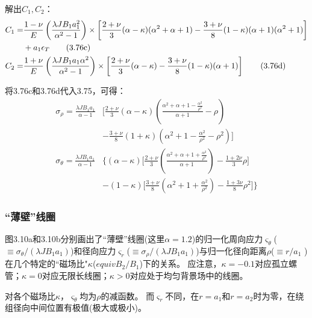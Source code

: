 解出$C_1,C_2$：
\begin{align*}
C_1=&\frac{1-\nu}{E}\left(\frac{\lambda JB_1a_1^2}{\alpha^2-1}\right)
\times\left[\frac{2+\nu}{3}(\alpha-\kappa)(\alpha^2+\alpha+1)
-\frac{3+\nu}{8}(1-\kappa)(\alpha+1)(\alpha^2+1)\right] \notag\\
&+a_1\epsilon_T\tag{3.76c}\\
C_2=&\frac{1+\nu}{E}\left(\frac{\lambda JB_1a_1\alpha^2}{\alpha^2-1}\right)\times \left[\frac{2+\nu}{3}(\alpha-\kappa)-\frac{3+\nu}{8}(1-\kappa)(\alpha+1)\right]\tag{3.76d}
\end{align*}

将3.76c和3.76d代入3.75，可得：
\begin{subequations}
	\begin{align}
\sigma_\rho=\frac{\lambda JB_1a_1}{\alpha-1}&\bigg[\frac{2+\nu}{3}(\alpha-\kappa)\left(\frac{\alpha^2+\alpha+1-\frac{\alpha^2}{\rho^2}}{\alpha+1}-\rho\right) \\ \nonumber
&-\frac{3+\nu}{8}(1+\kappa)\left(\alpha^2+1-\frac{\alpha^2}{\rho^2}-\rho^2\right)\bigg]\\
\sigma_\theta=\frac{\lambda JB_1a_1}{\alpha-1}&\bigg\{(\alpha-\kappa)\big[\frac{2+\nu}{3}\left(\frac{\alpha^2+\alpha+1+{\frac{\alpha^2}{\rho^2}}}{\alpha+1}\right)-\frac{1+2\nu}{3}\rho\big] \\ \nonumber
&-(1-\kappa)\big[\frac{3+\nu}{8}\left(\alpha^2+1+\frac{\alpha^2}{\rho^2}\right)-\frac{1+3\nu}{8}\rho^2\big]\bigg\}
	\end{align}
\end{subequations}

\subsubsection{``薄壁''线圈}
图3.10a和3.10b分别画出了``薄壁''线圈(这里$\alpha=1.2$)的归一化周向应力$\varsigma_\theta$($\equiv \sigma_{\theta}/(\lambda J B_1 a_1)$)和径向应力$\varsigma_r$($\equiv \sigma_{\rho}/(\lambda J B_1 a_1)$)与归一化径向距离$\rho$($\equiv r/a_1$ )在几个特定的``磁场比"$\kappa$($equiv B_2/B_1$)下的关系。
应注意，$\kappa=-0.1$对应孤立螺管；$\kappa=0$对应无限长线圈；$\kappa>0$对应处于均匀背景场中的线圈。

对各个磁场比$\kappa$，$\varsigma_\theta$均为$\rho$的减函数。
而$\varsigma_r$不同，在$r=a_1$和$r=a_2$时为零，在绕组径向中间位置有极值(极大或极小)。

